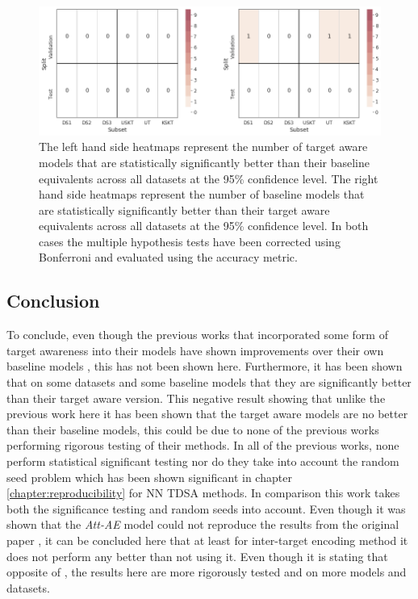 \begin{figure}[!h]
    \centering
    \includegraphics[scale=0.35]{images/augmentation/methods_performance/Inter_Target/inter_target_split_combined_heatmap.png}
    \caption{The left hand side heatmaps represent the number of target aware models that are statistically significantly better than their baseline equivalents across all datasets at the 95\% confidence level. The right hand side heatmaps represent the number of baseline models that are statistically significantly better than their target aware equivalents across all datasets at the 95\% confidence level. In both cases the multiple hypothesis tests have been corrected using Bonferroni and evaluated using the accuracy metric.}
    \label{fig:aug_inter_target_split_combined_heatmap}
\end{figure}

\subsection{Conclusion}
To conclude, even though the previous works that incorporated some form of target awareness into their models have shown improvements over their own baseline models \citep{zhao2019modeling, fan-etal-2018-multi}, this has not been shown here. Furthermore, it has been shown that on some datasets and some baseline models that they are significantly better than their target aware version. This negative result showing that unlike the previous work here it has been shown that the target aware models are no better than their baseline models, this could be due to none of the previous works performing rigorous testing of their methods. In all of the previous works, none perform statistical significant testing nor do they take into account the random seed problem \citep{reimers-gurevych-2017-reporting} which has been shown significant in chapter \ref{chapter:reproducibility} for NN TDSA methods. In comparison this work takes both the significance testing and random seeds into account. Even though it was shown that the \textit{Att-AE} model could not reproduce the results from the original paper \citep{hazarika-etal-2018-modeling}, it can be concluded here that at least for \citet{hazarika-etal-2018-modeling} inter-target encoding method it does not perform any better than not using it. Even though it is stating that opposite of  \citet{hazarika-etal-2018-modeling}, the results here are more rigorously tested and on more models and datasets.

